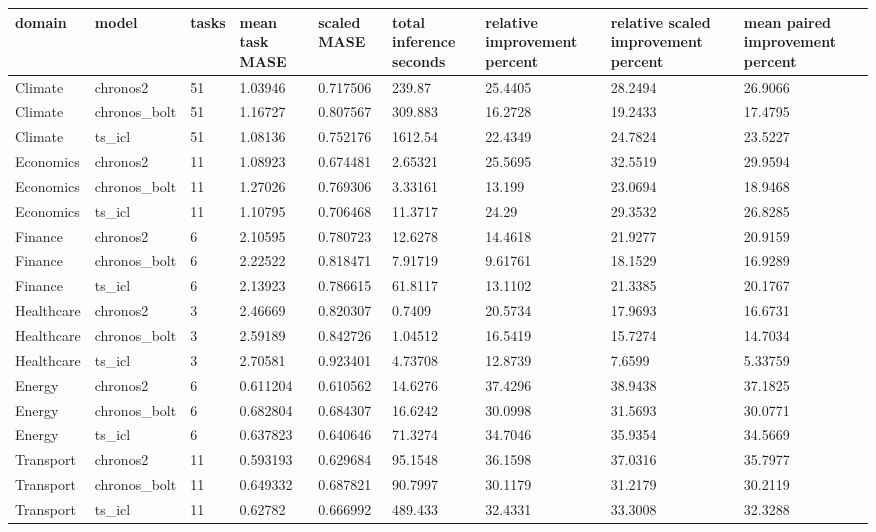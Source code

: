 \begin{tabular}{lllllllll}
\toprule
domain & model & tasks & mean task MASE & scaled MASE & total inference seconds & relative improvement percent & relative scaled improvement percent & mean paired improvement percent \\
\midrule
Climate & chronos2 & 51 & 1.03946 & 0.717506 & 239.87 & 25.4405 & 28.2494 & 26.9066 \\
Climate & chronos\_bolt & 51 & 1.16727 & 0.807567 & 309.883 & 16.2728 & 19.2433 & 17.4795 \\
Climate & ts\_icl & 51 & 1.08136 & 0.752176 & 1612.54 & 22.4349 & 24.7824 & 23.5227 \\
Economics & chronos2 & 11 & 1.08923 & 0.674481 & 2.65321 & 25.5695 & 32.5519 & 29.9594 \\
Economics & chronos\_bolt & 11 & 1.27026 & 0.769306 & 3.33161 & 13.199 & 23.0694 & 18.9468 \\
Economics & ts\_icl & 11 & 1.10795 & 0.706468 & 11.3717 & 24.29 & 29.3532 & 26.8285 \\
Finance & chronos2 & 6 & 2.10595 & 0.780723 & 12.6278 & 14.4618 & 21.9277 & 20.9159 \\
Finance & chronos\_bolt & 6 & 2.22522 & 0.818471 & 7.91719 & 9.61761 & 18.1529 & 16.9289 \\
Finance & ts\_icl & 6 & 2.13923 & 0.786615 & 61.8117 & 13.1102 & 21.3385 & 20.1767 \\
Healthcare & chronos2 & 3 & 2.46669 & 0.820307 & 0.7409 & 20.5734 & 17.9693 & 16.6731 \\
Healthcare & chronos\_bolt & 3 & 2.59189 & 0.842726 & 1.04512 & 16.5419 & 15.7274 & 14.7034 \\
Healthcare & ts\_icl & 3 & 2.70581 & 0.923401 & 4.73708 & 12.8739 & 7.6599 & 5.33759 \\
Energy & chronos2 & 6 & 0.611204 & 0.610562 & 14.6276 & 37.4296 & 38.9438 & 37.1825 \\
Energy & chronos\_bolt & 6 & 0.682804 & 0.684307 & 16.6242 & 30.0998 & 31.5693 & 30.0771 \\
Energy & ts\_icl & 6 & 0.637823 & 0.640646 & 71.3274 & 34.7046 & 35.9354 & 34.5669 \\
Transport & chronos2 & 11 & 0.593193 & 0.629684 & 95.1548 & 36.1598 & 37.0316 & 35.7977 \\
Transport & chronos\_bolt & 11 & 0.649332 & 0.687821 & 90.7997 & 30.1179 & 31.2179 & 30.2119 \\
Transport & ts\_icl & 11 & 0.62782 & 0.666992 & 489.433 & 32.4331 & 33.3008 & 32.3288 \\

\end{tabular}

